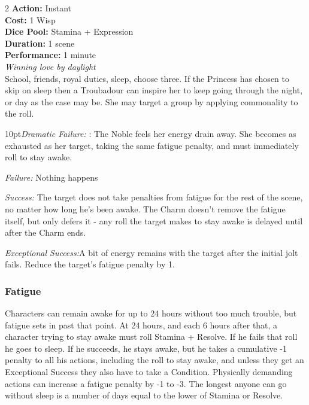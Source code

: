 \begin{multicols}{2}
\noindent \textbf{Action:} Instant  \\

\noindent \textbf{Cost:} 1 Wisp\\

\noindent \textbf{Dice Pool:} Stamina + Expression\\

\noindent \textbf{Duration:}  1 scene\\

\noindent \textbf{Performance:} 1 minute \\

\textit{Winning love by daylight} \\

\noindent School, friends, royal duties, sleep, choose three. If the Princess has chosen to skip on sleep then a Troubadour can inspire her to keep going through the night, or day as the case may be. She may target a group by applying commonality to the roll. 

\begin{myindentpar}{10pt}\emph{Dramatic Failure:} : The Noble feels her energy drain away. She becomes as exhausted as her target, taking the same fatigue penalty, and must immediately roll to stay awake.
 
 \emph{Failure:} Nothing happens
 
 \emph{Success:} The target does not take penalties from fatigue for the rest of the scene, no matter how long he’s been awake. The Charm doesn’t remove the fatigue itself, but only defers it - any roll the target makes to stay awake is delayed until after the Charm ends.
 
 \emph{Exceptional Success:}A bit of energy remains with the target after the initial jolt fails. Reduce the target’s fatigue penalty by 1.
 \end{myindentpar}
 
\begin{mybox}

\subsubsection*{Fatigue}

 Characters can remain awake for up to 24 hours without too much trouble, but fatigue sets in past that point. At 24 hours, and each 6 hours after that, a character trying to stay awake must roll Stamina + Resolve. If he fails that roll he goes to sleep. If he succeeds, he stays awake, but he takes a cumulative -1 penalty to all his actions, including the roll to stay awake, and unless they get an Exceptional Success they also have to take a Condition. Physically demanding actions can increase a fatigue penalty by -1 to -3. The longest anyone can go without sleep is a number of days equal to the lower of Stamina or Resolve. 
 \end{mybox}


\end{multicols}
